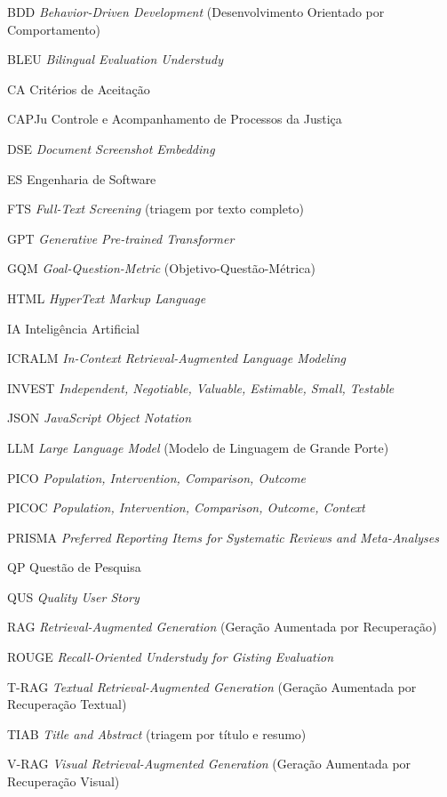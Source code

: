 \begin{siglas}
  \item[BDD] \textit{Behavior-Driven Development} (Desenvolvimento Orientado por Comportamento)
  \item[BLEU] \textit{Bilingual Evaluation Understudy}
  \item[CA] Critérios de Aceitação
  \item[CAPJu] Controle e Acompanhamento de Processos da Justiça
  \item[DSE] \textit{Document Screenshot Embedding}
  \item[ES] Engenharia de Software
  \item[FTS] \textit{Full-Text Screening} (triagem por texto completo)
  \item[GPT] \textit{Generative Pre-trained Transformer}
  \item[GQM] \textit{Goal-Question-Metric} (Objetivo-Questão-Métrica)
  \item[HTML] \textit{HyperText Markup Language}
  \item[IA] Inteligência Artificial
  \item[ICRALM] \textit{In-Context Retrieval-Augmented Language Modeling}
  \item[INVEST] \textit{Independent, Negotiable, Valuable, Estimable, Small, Testable}
  \item[JSON] \textit{JavaScript Object Notation}
  \item[LLM] \textit{Large Language Model} (Modelo de Linguagem de Grande Porte)
  \item[PICO] \textit{Population, Intervention, Comparison, Outcome}
  \item[PICOC] \textit{Population, Intervention, Comparison, Outcome, Context}
  \item[PRISMA] \textit{Preferred Reporting Items for Systematic Reviews and Meta-Analyses}
  \item[QP] Questão de Pesquisa
  \item[QUS] \textit{Quality User Story}
  \item[RAG] \textit{Retrieval-Augmented Generation} (Geração Aumentada por Recuperação)
  \item[ROUGE] \textit{Recall-Oriented Understudy for Gisting Evaluation}
  \item[T-RAG] \textit{Textual Retrieval-Augmented Generation} (Geração Aumentada por Recuperação Textual)
  \item[TIAB] \textit{Title and Abstract} (triagem por título e resumo)
  \item[V-RAG] \textit{Visual Retrieval-Augmented Generation} (Geração Aumentada por Recuperação Visual)
\end{siglas}